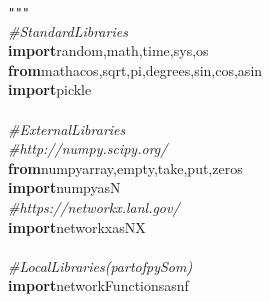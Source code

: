 {{\begin{tabbing}
{\texttt{\string"}}{\texttt{\string"\string"}}\\
{\it{\#\hspace{6pt}Standard\hspace{6pt}Libraries}}\\
{\textbf{import}}\hspace{6pt}random,math,time,sys,os\\
{\textbf{from}}\hspace{6pt}math\hspace{6pt}acos,sqrt,pi,degrees,sin,cos,asin\\
{\textbf{import}}\hspace{6pt}pickle\\
\\
{\it{\#\hspace{6pt}External\hspace{6pt}Libraries}}\\
{\it{\#\hspace{6pt}http://numpy.scipy.org/}}\\
{\textbf{from}}\hspace{6pt}numpy\hspace{6pt}array,empty,take,put,zeros\\
{\textbf{import}}\hspace{6pt}numpy\hspace{6pt}as\hspace{6pt}N\\
{\it{\#\hspace{6pt}https://networkx.lanl.gov/}}\\
{\textbf{import}}\hspace{6pt}networkx\hspace{6pt}as\hspace{6pt}NX\\
\\
{\it{\#\hspace{6pt}Local\hspace{6pt}Libraries\hspace{6pt}(part\hspace{6pt}of\hspace{6pt}pySom)}}\\
{\textbf{import}}\hspace{6pt}networkFunctions\hspace{6pt}as\hspace{6pt}nf\\

\end{tabbing}}}
